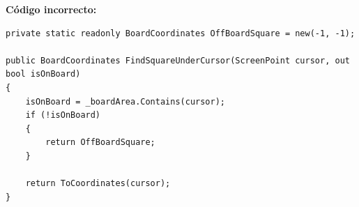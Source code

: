 \textbf{Código incorrecto:}
\begin{lstlisting}[style=csharpstyle,basicstyle=\ttfamily\scriptsize]
private static readonly BoardCoordinates OffBoardSquare = new(-1, -1);

public BoardCoordinates FindSquareUnderCursor(ScreenPoint cursor, out bool isOnBoard)
{
    isOnBoard = _boardArea.Contains(cursor);
    if (!isOnBoard)
    {
        return OffBoardSquare;
    }

    return ToCoordinates(cursor);
}
\end{lstlisting}
